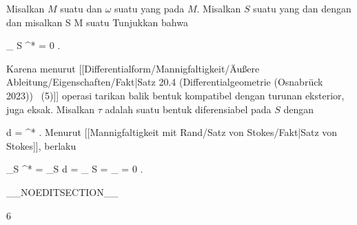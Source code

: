 {

Misalkan $M$ suatu
dan $\omega$ suatu
yang
pada $M$. Misalkan $S$ suatu
yang
dan
 {} {}
dengan
dan misalkan
\maabbdisp {\varphi} { S } { M
} {}
suatu
Tunjukkan bahwa

\mavergleichskettedisp
{\vergleichskette
{
\int_{  S  }   \varphi^*\omega
}
{ =} { 0
}
{ } {
}
{ } {
}
{ } {
}
}
{}{}{.}

}
{

Karena menurut
[[Differentialform/Mannigfaltigkeit/Äußere Ableitung/Eigenschaften/Fakt|Satz 20.4 (Differentialgeometrie (Osnabrück 2023))  (5)]]
operasi tarikan balik bentuk kompatibel dengan turunan eksterior,
\mathl{\varphi^*\omega}{} juga eksak. Misalkan $\tau$ adalah suatu bentuk diferensiabel pada $S$ dengan

\mavergleichskettedisp
{\vergleichskette
{d \tau
}
{ =} { \varphi^* \omega
}
{ } {
}
{ } {
}
{ } {
}
}
{}{}{.}
Menurut
[[Mannigfaltigkeit mit Rand/Satz von Stokes/Fakt|Satz von Stokes]],
berlaku

\mavergleichskettedisp
{\vergleichskette
{ \int_S \varphi^* \omega
}
{ =} { \int_S d \tau
}
{ =} { \int_{ \partial S } \tau
}
{ =} { \int_\emptyset \tau
}
{ =} { 0
}
}
{}{}{.}

 }

__NOEDITSECTION__

{6}

